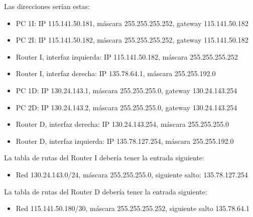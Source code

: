 \documentclass[letterpaper,10pt,spanish]{sphinxmanual}
\begin{document}
\sphinxAtStartPar
Las direcciones serían estas:
\begin{itemize}
\item {} 
\sphinxAtStartPar
PC 1I: IP 115.141.50.181, máscara 255.255.255.252, gateway 115.141.50.182

\item {} 
\sphinxAtStartPar
PC 2I: IP 115.141.50.182, máscara 255.255.255.252, gateway 115.141.50.182

\item {} 
\sphinxAtStartPar
Router I, interfaz izquierda: IP 115.141.50.182, máscara 255.255.255.252

\item {} 
\sphinxAtStartPar
Router I, interfaz derecha: IP 135.78.64.1, máscara 255.255.192.0

\item {} 
\sphinxAtStartPar
PC 1D: IP 130.24.143.1, máscara 255.255.255.0, gateway 130.24.143.254

\item {} 
\sphinxAtStartPar
PC 2D: IP 130.24.143.2, máscara 255.255.255.0, gateway 130.24.143.254

\item {} 
\sphinxAtStartPar
Router D, interfaz derecha: IP 130.24.143.254, máscara 255.255.255.0

\item {} 
\sphinxAtStartPar
Router D, interfaz izquierda: IP 135.78.127.254, máscara 255.255.192.0

\end{itemize}

\sphinxAtStartPar
La tabla de rutas del Router I debería tener la entrada siguiente:
\begin{itemize}
\item {} 
\sphinxAtStartPar
Red 130.24.143.0/24, máscara 255.255.255.0, siguiente salto: 135.78.127.254

\end{itemize}

\sphinxAtStartPar
La tabla de rutas del Router D debería tener la entrada siguiente:
\begin{itemize}
\item {} 
\sphinxAtStartPar
Red 115.141.50.180/30, máscara 255.255.255.252, siguiente salto 135.78.64.1

\end{itemize}
\end{document}
